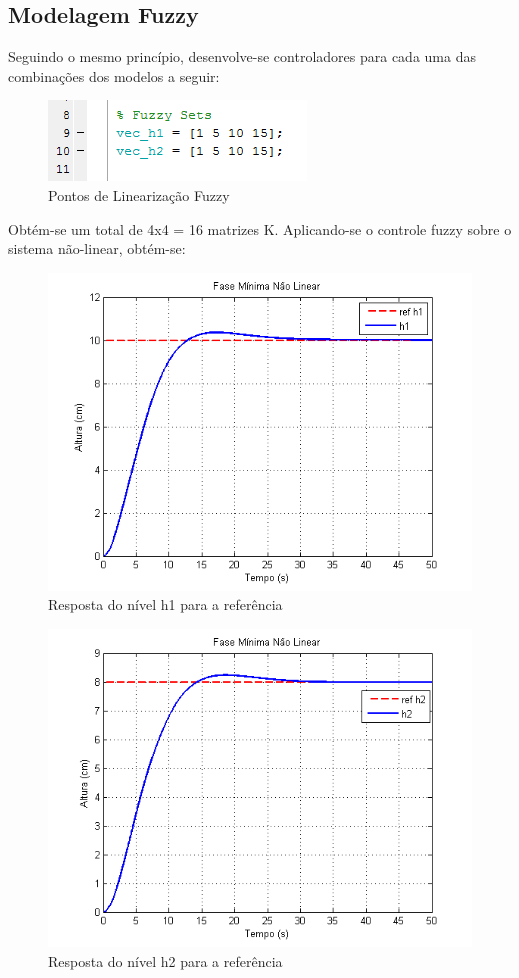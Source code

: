 \documentclass[11pt,]{article}
\begin{document}
	\subsection{Modelagem Fuzzy}    
    Seguindo o mesmo princípio, desenvolve-se controladores para cada uma das combinações dos modelos a seguir:
	\begin{figure}[H]
		\centering
		\includegraphics[scale=1]{cod_fuz_1_5_10_15.png}
		\caption{Pontos de Linearização Fuzzy}
		\label{CodigoLinFuzzy}
	\end{figure}
	
	Obtém-se um total de 4x4 = 16 matrizes K. Aplicando-se o controle fuzzy sobre o sistema não-linear, obtém-se:
	\begin{figure}[H]
		\centering
		\includegraphics[scale=1]{h1_fuz_fm.png}
		\caption{Resposta do nível h1 para a referência}
		\label{h1_fuz_fm}
	\end{figure}
	\begin{figure}[H]
		\centering
		\includegraphics[scale=1]{h2_fuz_fm.png}
		\caption{Resposta do nível h2 para a referência}
		\label{h2_fuz_fm}
	\end{figure}
	
\end{document}
